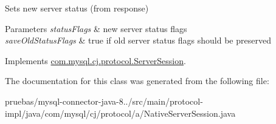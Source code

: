 Sets new server status (from response)


\begin{DoxyParams}{Parameters}
{\em status\+Flags} & new server status flags \\
\hline
{\em save\+Old\+Status\+Flags} & true if old server status flags should be preserved \\
\hline
\end{DoxyParams}


Implements \mbox{\hyperlink{interfacecom_1_1mysql_1_1cj_1_1protocol_1_1_server_session_acf86f0ae9cdfd88f758ec42bb72bf127}{com.\+mysql.\+cj.\+protocol.\+Server\+Session}}.



The documentation for this class was generated from the following file\+:\begin{DoxyCompactItemize}
\item 
pruebas/mysql-\/connector-\/java-\/8../src/main/protocol-\/impl/java/com/mysql/cj/protocol/a/Native\+Server\+Session.\+java\end{DoxyCompactItemize}
